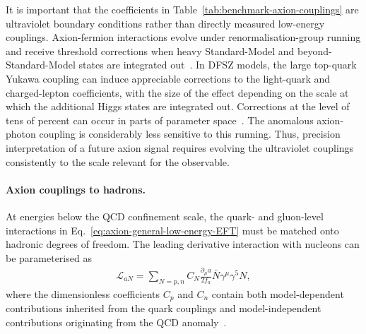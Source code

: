 \documentclass[review]{elsarticle}
\numberwithin{equation}{section}
\numberwithin{table}{section}
\numberwithin{figure}{section}
\begin{document}
It is important that the coefficients in Table~\ref{tab:benchmark-axion-couplings} are ultraviolet boundary conditions rather than directly measured low-energy couplings. Axion-fermion interactions evolve under renormalisation-group running and receive threshold corrections when heavy Standard-Model and beyond-Standard-Model states are integrated out~\cite{Bauer:2020jbp,Choi:2021kuy,DiLuzio:2023tqe}. In DFSZ models, the large top-quark Yukawa coupling can induce appreciable corrections to the light-quark and charged-lepton coefficients, with the size of the effect depending on the scale at which the additional Higgs states are integrated out. Corrections at the level of tens of percent can occur in parts of parameter space~\cite{DiLuzio:2023tqe}. The anomalous axion-photon coupling is considerably less sensitive to this running. Thus, precision interpretation of a future axion signal requires evolving the ultraviolet couplings consistently to the scale relevant for the observable.

\paragraph{Axion couplings to hadrons.}

At energies below the QCD confinement scale, the quark- and gluon-level interactions in Eq.~\eqref{eq:axion-general-low-energy-EFT} must be matched onto hadronic degrees of freedom. The leading derivative interaction with nucleons can be parameterised as
\begin{align}
    \mathcal{L}_{aN}
    =
    \sum_{N=p,n}
    C_N
    \frac{\partial_\mu a}{2f_a}
    \bar N\gamma^\mu\gamma^5N,
    \label{eq:axion-nucleon-coupling}
\end{align}
where the dimensionless coefficients $C_p$ and $C_n$ contain both model-dependent contributions inherited from the quark couplings and model-independent contributions originating from the QCD anomaly~\cite{Srednicki:1985xd,Georgi:1986df,GrilliDiCortona:2015jxo,Vonk:2020zfh}.  
\end{document}
